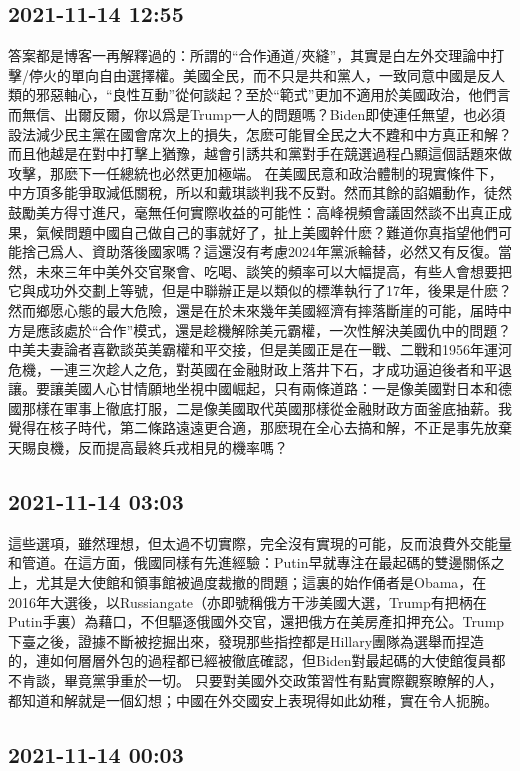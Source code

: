 \documentclass[twocolumn]{ctexart}
\begin{document}
\subsection*{2021-11-14 12:55}

答案都是博客一再解釋過的：所謂的“合作通道/夾縫”，其實是白左外交理論中打擊/停火的單向自由選擇權。美國全民，而不只是共和黨人，一致同意中國是反人類的邪惡軸心，“良性互動”從何談起？至於“範式”更加不適用於美國政治，他們言而無信、出爾反爾，你以爲是Trump一人的問題嗎？Biden即使連任無望，也必須設法減少民主黨在國會席次上的損失，怎麽可能冒全民之大不韙和中方真正和解？而且他越是在對中打擊上猶豫，越會引誘共和黨對手在競選過程凸顯這個話題來做攻擊，那麽下一任總統也必然更加極端。
在美國民意和政治體制的現實條件下，中方頂多能爭取減低關稅，所以和戴琪談判我不反對。然而其餘的諂媚動作，徒然鼓勵美方得寸進尺，毫無任何實際收益的可能性：高峰視頻會議固然談不出真正成果，氣候問題中國自己做自己的事就好了，扯上美國幹什麽？難道你真指望他們可能捨己爲人、資助落後國家嗎？這還沒有考慮2024年黨派輪替，必然又有反復。當然，未來三年中美外交官聚會、吃喝、談笑的頻率可以大幅提高，有些人會想要把它與成功外交劃上等號，但是中聯辦正是以類似的標準執行了17年，後果是什麽？
然而鄉愿心態的最大危險，還是在於未來幾年美國經濟有摔落斷崖的可能，届時中方是應該處於“合作”模式，還是趁機解除美元霸權，一次性解決美國仇中的問題？中美夫妻論者喜歡談英美霸權和平交接，但是美國正是在一戰、二戰和1956年運河危機，一連三次趁人之危，對英國在金融財政上落井下石，才成功逼迫後者和平退讓。要讓美國人心甘情願地坐視中國崛起，只有兩條道路：一是像美國對日本和德國那樣在軍事上徹底打服，二是像美國取代英國那樣從金融財政方面釜底抽薪。我覺得在核子時代，第二條路遠遠更合適，那麽現在全心去搞和解，不正是事先放棄天賜良機，反而提高最終兵戎相見的機率嗎？
\subsection*{2021-11-14 03:03}

這些選項，雖然理想，但太過不切實際，完全沒有實現的可能，反而浪費外交能量和管道。在這方面，俄國同樣有先進經驗：Putin早就專注在最起碼的雙邊關係之上，尤其是大使館和領事館被過度裁撤的問題；這裏的始作俑者是Obama，在2016年大選後，以Russiangate（亦即號稱俄方干涉美國大選，Trump有把柄在Putin手裏）為藉口，不但驅逐俄國外交官，還把俄方在美房產扣押充公。Trump下臺之後，證據不斷被挖掘出來，發現那些指控都是Hillary團隊為選舉而捏造的，連如何層層外包的過程都已經被徹底確認，但Biden對最起碼的大使館復員都不肯談，畢竟黨爭重於一切。
只要對美國外交政策習性有點實際觀察瞭解的人，都知道和解就是一個幻想；中國在外交國安上表現得如此幼稚，實在令人扼腕。
\subsection*{2021-11-14 00:03}
\end{document}
